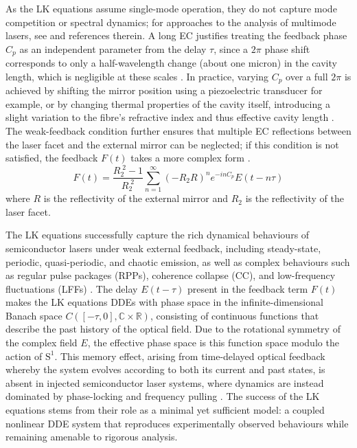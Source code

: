 As the LK equations assume single-mode operation, they do not capture mode competition or spectral dynamics; for approaches to the analysis of multimode lasers, see \cite{yacomotti2004dynamics} and references therein.
A long EC justifies treating the feedback phase $C_p$ as an independent parameter from the delay $\tau$, since a $2\pi$ phase shift corresponds to only a half-wavelength change (about one micron) in the cavity length, which is negligible at these scales \cite{green2006mode}.
In practice, varying $C_p$ over a full $2\pi$ is achieved by shifting the mirror position using a piezoelectric transducer \cite{heil2003delay} for example, or by changing thermal properties of the cavity itself, introducing a slight variation to the fibre's refractive index and thus effective cavity length \cite{skenderas2021feedback}.
The weak-feedback condition further ensures that multiple EC reflections between the laser facet and the external mirror can be neglected; if this condition is not satisfied, the feedback $F(t)$ takes a more complex form \cite{vantartwijk1995semiconductor}.
%
\begin{equation}
\label{eq:multiple_EC}
    F(t) = \frac{R_2^{\;2} - 1}{R_2^{\;2}} \sum_{n=1}^\infty (-R_2 R)^n e^{-i n C_p} E(t-n \tau)
\end{equation}
%
where $R$ is the reflectivity of the external mirror and $R_2$ is the reflectivity of the laser facet.
%
\par
%
The LK equations successfully capture the rich dynamical behaviours of semiconductor lasers under weak external feedback, including steady-state, periodic, quasi-periodic, and chaotic emission, as well as complex behaviours such as regular pulse packages (RPPs), coherence collapse (CC), and low-frequency fluctuations (LFFs) \cite{heil1998coexistence}.
The delay $E(t-\tau)$ present in the feedback term $F(t)$ makes the LK equations DDEs with phase space in the infinite-dimensional Banach space $C([-\tau,0],\mathbb{C}\times\mathbb{R})$, consisting of continuous functions that describe the past history of the optical field.
Due to the rotational symmetry of the complex field $E$, the effective phase space is this function space modulo the action of $\mathrm{S}^1$.
This memory effect, arising from time-delayed optical feedback whereby the system evolves according to both its current and past states, is absent in injected semiconductor laser systems, where dynamics are instead dominated by phase-locking and frequency pulling \cite{wieczorek1999unifying,wieczorek2005dynamical}.
The success of the LK equations stems from their role as a minimal yet sufficient model: a coupled nonlinear DDE system that reproduces experimentally observed behaviours while remaining amenable to rigorous analysis.
